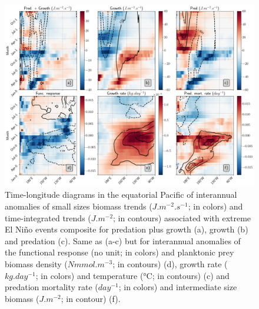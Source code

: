 \begin{figure}[h!tp]
	\centering
	\includegraphics[scale=0.4]{figs/fig8.png}	
	\caption{Time-longitude diagrams in the equatorial Pacific of interannual anomalies of small sizes biomass trends ($J.m^{-2}.s^{-1}$; in colors) and time-integrated trends ($J.m^{-2}$; in contours) associated with extreme El Niño events composite for predation plus growth (a), growth (b) and predation (c). Same as (a-c) but for interannual anomalies of the functional response (no unit; in colors) and planktonic prey biomass density ($Nmmol.m^{-3}$; in contours) (d), growth rate ($kg.day^{-1}$; in colors) and temperature (°C; in contours) (c) and predation mortality rate ($day^{-1}$; in colors) and intermediate size biomass ($J.m^{-2}$; in contour) (f).}
	\label{fig:fig8}
\end{figure}

